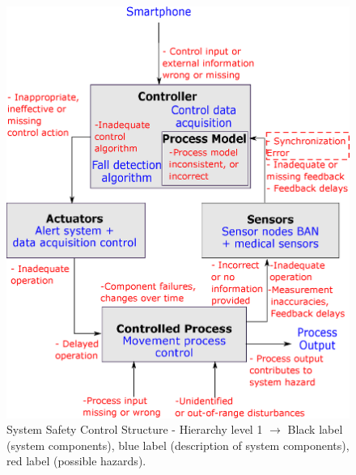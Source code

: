 \documentclass[10pt,journal,compsoc]{IEEEtran}
\begin{document}
	\begin{figure}[!ht]
		\centering
		\includegraphics[scale=0.3125]{Images/STAMP_SynchError(2).eps}
		\caption[System Safety Control Structure]{System Safety Control Structure - Hierarchy level 1 $\rightarrow$ Black label (system components), blue label (description of system components), red label (possible hazards).}
		\label{fig:STAMPLevel1}
	\end{figure}
\end{document}
